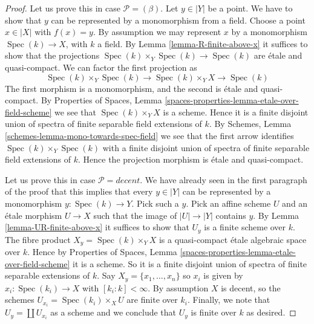 \documentclass{stacks-project}
\theoremstyle{plain}
\theoremstyle{definition}
\theoremstyle{remark}
\numberwithin{equation}{subsection}
\def\Spec{\mathop{\mathrm{Spec}}}
\begin{document}
\begin{proof}
Let us prove this in case $\mathcal{P} = (\beta)$. Let $y \in |Y|$ be
a point. We have to show that $y$ can be represented by a monomorphism
from a field. Choose a point $x \in |X|$ with $f(x) = y$.
By assumption we may represent $x$ by a monomorphism
$\Spec(k) \to X$, with $k$ a field. By
Lemma \ref{lemma-R-finite-above-x}
it suffices to show that the projections
$\Spec(k) \times_Y \Spec(k) \to \Spec(k)$
are \'etale and quasi-compact. We can factor the first projection as
$$
\Spec(k) \times_Y \Spec(k)
\longrightarrow
\Spec(k) \times_Y X
\longrightarrow
\Spec(k)
$$
The first morphism is a monomorphism, and the second is \'etale and
quasi-compact. By
Properties of Spaces,
Lemma \ref{spaces-properties-lemma-etale-over-field-scheme}
we see that $\Spec(k) \times_Y X$ is a scheme. Hence it is a
finite disjoint union of spectra of finite separable field extensions
of $k$. By
Schemes, Lemma \ref{schemes-lemma-mono-towards-spec-field}
we see that the first arrow identifies
$\Spec(k) \times_Y \Spec(k)$ with a finite disjoint
union of spectra of finite separable field extensions of $k$.
Hence the projection morphism is \'etale and quasi-compact.

\medskip\noindent
Let us prove this in case $\mathcal{P} = decent$.
We have already seen in the first paragraph of the proof that this implies
that every $y \in |Y|$ can be represented by a monomorphism
$y : \Spec(k) \to Y$. Pick such a $y$. Pick an affine
scheme $U$ and an \'etale morphism $U \to X$ such that the image
of $|U| \to |Y|$ contains $y$. By
Lemma \ref{lemma-UR-finite-above-x}
it suffices to show that $U_y$ is a finite scheme over $k$. The fibre
product $X_y = \Spec(k) \times_Y X$ is a quasi-compact \'etale
algebraic space over $k$. Hence by
Properties of Spaces,
Lemma \ref{spaces-properties-lemma-etale-over-field-scheme}
it is a scheme. So it is a finite disjoint union of spectra of
finite separable extensions of $k$. Say $X_y = \{x_1, \ldots, x_n\}$
so $x_i$ is given by  $x_i : \Spec(k_i) \to X$ with
$[k_i : k] < \infty$. By assumption $X$ is decent, so the schemes
$U_{x_i} = \Spec(k_i) \times_X U$ are finite over $k_i$.
Finally, we note that $U_y = \coprod U_{x_i}$ as a scheme and we conclude
that $U_y$ is finite over $k$ as desired.


\end{proof}
\end{document}
